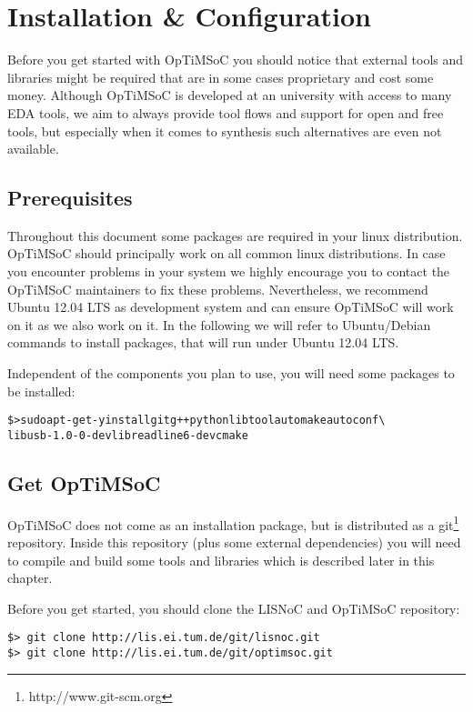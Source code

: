 \chapter{Installation \& Configuration}
\label{chap:installation}

Before you get started with OpTiMSoC you should notice that external
tools and libraries might be required that are in some cases
proprietary and cost some money. Although OpTiMSoC is developed at an
university with access to many EDA tools, we aim to always provide
tool flows and support for open and free tools, but especially when it
comes to synthesis such alternatives are even not available.

\section{Prerequisites}

Throughout this document some packages are required in your linux
distribution. OpTiMSoC should principally work on all common linux
distributions. In case you encounter problems in your system we highly
encourage you to contact the OpTiMSoC maintainers to fix these
problems. Nevertheless, we recommend Ubuntu 12.04 LTS as development
system and can ensure OpTiMSoC will work on it as we also work on it.
In the following we will refer to Ubuntu/Debian commands to install
packages, that will run under Ubuntu 12.04 LTS.

Independent of the components you plan to use, you will need some
packages to be installed:

\begin{alltt}
\$> sudo apt-get -y install git g++ python libtool automake autoconf \textbackslash
   libusb-1.0-0-dev libreadline6-dev cmake
\end{alltt}

\section{Get OpTiMSoC}

OpTiMSoC does not come as an installation package, but is distributed
as a git\footnote{http://www.git-scm.org} repository. Inside this
repository (plus some external dependencies) you will need to compile
and build some tools and libraries which is described later in this
chapter.

Before you get started, you should clone the LISNoC and OpTiMSoC
repository:

\begin{verbatim}
$> git clone http://lis.ei.tum.de/git/lisnoc.git
$> git clone http://lis.ei.tum.de/git/optimsoc.git
\end{verbatim}

